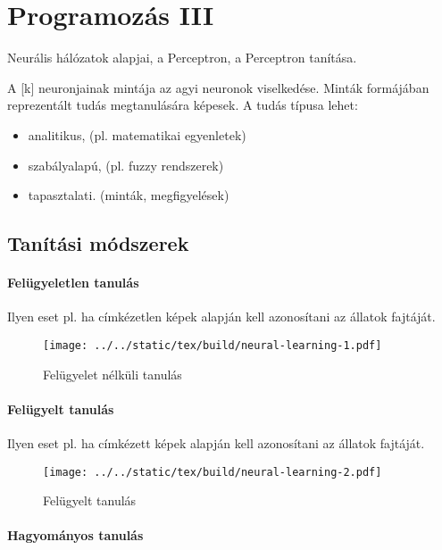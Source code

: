 \documentclass[../../main.tex]{subfiles}
\begin{document}
\section{Programozás III}

\begin{fulltheorem}
  Neurális hálózatok alapjai, a Perceptron, a Perceptron tanítása.
\end{fulltheorem}

A [k] neuronjainak mintája az agyi neuronok viselkedése.
Minták formájában reprezentált tudás megtanulására képesek. A tudás típusa
lehet:
\begin{itemize}
  \item analitikus, (pl. matematikai egyenletek)
  \item szabályalapú, (pl. fuzzy rendszerek)
  \item tapasztalati. (minták, megfigyelések)
\end{itemize}

\subsection{Tanítási módszerek}

\paragraph{Felügyeletlen tanulás}

Ilyen eset pl. ha címkézetlen képek alapján kell azonosítani az állatok fajtáját.

\begin{figure}[H]
  \centering
  \texttt{[image: ../../static/tex/build/neural-learning-1.pdf]}
  \caption{Felügyelet nélküli tanulás}
  \label{fig:learning1}
\end{figure}

\paragraph{Felügyelt tanulás}

Ilyen eset pl. ha címkézett képek alapján kell azonosítani az állatok fajtáját.

\begin{figure}[H]
  \centering
  \texttt{[image: ../../static/tex/build/neural-learning-2.pdf]}
  \caption{Felügyelt tanulás}
  \label{fig:learning2}
\end{figure}

\paragraph{Hagyományos tanulás}\;
\end{document}
